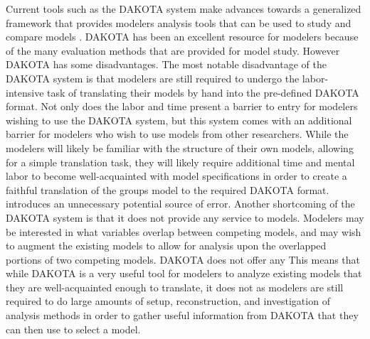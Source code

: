 Current tools such as the DAKOTA system make advances towards a generalized framework that provides modelers analysis tools that can be used to study and compare models \citep{adams2009dakota}.
DAKOTA has been an excellent resource for modelers because of the many evaluation methods that are provided for model study.
However DAKOTA has some disadvantages.
The most notable disadvantage of the DAKOTA system is that modelers are still required to undergo the labor-intensive task of translating their models by hand into the pre-defined DAKOTA format.
Not only does the labor and time present a barrier to entry for modelers wishing to use the DAKOTA system, but this system comes with an additional barrier for modelers who wish to use models from other researchers.
While the modelers will likely be familiar with the structure of their own models, allowing for a simple translation task, they will likely require additional time and mental labor to become well-acquainted with model specifications 
in order to create a faithful translation of the groups model to the required DAKOTA format.
introduces an unnecessary potential source of error. Another shortcoming of the DAKOTA system is that it does not provide any service to  models. Modelers may be interested in what variables overlap between competing models, and may wish to augment the existing models to allow for analysis upon the overlapped portions of two competing models.
DAKOTA does not offer any  %
This means that while DAKOTA is a very useful tool for modelers to analyze existing models that they are well-acquainted enough to translate, it does not
as modelers are still required to do large amounts of setup, reconstruction, and investigation of analysis methods in order to gather useful information from DAKOTA that they can then use to select a model.

